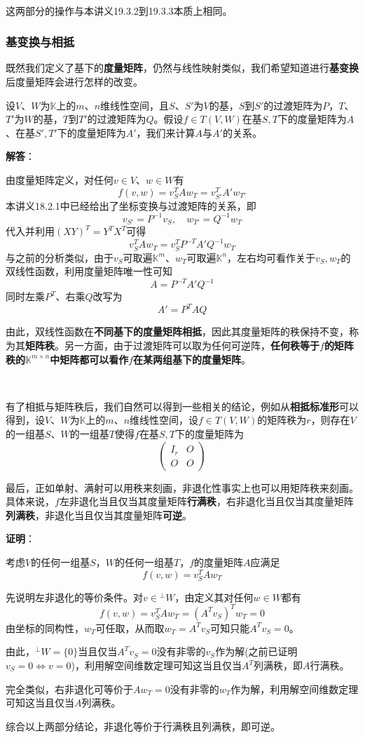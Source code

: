 \documentclass[a4paper,UTF8,fontset=windows,AutoFakeBold]{ctexart}
\newcommand*{\note}{\noindent *}
\newcommand{\proo}[1]{{\vspace{5pt}\kaishu\noindent\textbf{证明}：\vspace{-3pt}
\begin{compactitem}
    \item[] #1
\end{compactitem}
}}
\newcommand{\sol}[1]{{\vspace{5pt}\kaishu\noindent\textbf{解答}：\vspace{-3pt}
\begin{compactitem}
    \item[] #1
\end{compactitem}
}}
\begin{document}
\

\note 这两部分的操作与本讲义19.3.2到19.3.3本质上相同。

\subsubsection{基变换与相抵}
既然我们定义了基下的\textbf{度量矩阵}，仍然与线性映射类似，我们希望知道进行\textbf{基变换}后度量矩阵会进行怎样的改变。

设$V$、$W$为$\mathbb{K}$上的$m$、$n$维线性空间，且$S$、$S'$为$V$的基，$S$到$S'$的过渡矩阵为$P$，$T$、$T'$为$W$的基，$T$到$T'$的过渡矩阵为$Q$。假设$f\in T(V,W)$在基$S,T$下的度量矩阵为$A$、在基$S',T'$下的度量矩阵为$A'$，我们来计算$A$与$A'$的关系。

\sol{
    由度量矩阵定义，对任何$v\in V$、$w\in W$有
    $$f(v,w)=v_S^TAw_T=v_{S'}^TA'w_{T'}$$
    本讲义18.2.1中已经给出了坐标变换与过渡矩阵的关系，即
    $$v_{S'}=P^{-1}v_S,\quad w_{T'}=Q^{-1}w_T$$
    代入并利用$(XY)^T=Y^TX^T$可得
    $$v_S^TAw_T=v_S^TP^{-T}A'Q^{-1}w_T$$
    与之前的分析类似，由于$v_S$可取遍$\mathbb{K}^m$、$w_T$可取遍$\mathbb{K}^n$，左右均可看作关于$v_S,w_T$的双线性函数，利用度量矩阵唯一性可知
    $$A=P^{-T}A'Q^{-1}$$
    同时左乘$P^T$、右乘$Q$改写为
    $$A'=P^TAQ$$
}

由此，双线性函数在\textbf{不同基下的度量矩阵相抵}，因此其度量矩阵的秩保持不变，称为其\textbf{矩阵秩}。另一方面，由于过渡矩阵可以取为任何可逆阵，\textbf{任何秩等于$f$的矩阵秩的$\mathbb{K}^{m\times n}$中矩阵都可以看作$f$在某两组基下的度量矩阵}。

\

有了相抵与矩阵秩后，我们自然可以得到一些相关的结论，例如从\textbf{相抵标准形}可以得到，设$V$、$W$为$\mathbb{K}$上的$m$、$n$维线性空间，设$f\in T(V,W)$的矩阵秩为$r$，则存在$V$的一组基$S$、$W$的一组基$T$使得$f$在基$S,T$下的度量矩阵为
$$\begin{pmatrix}I_r&O\\O&O\end{pmatrix}$$

最后，正如单射、满射可以用秩来刻画，非退化性事实上也可以用矩阵秩来刻画。具体来说，$f$左非退化当且仅当其度量矩阵\textbf{行满秩}，右非退化当且仅当其度量矩阵\textbf{列满秩}，非退化当且仅当其度量矩阵\textbf{可逆}。

\proo{
    考虑$V$的任何一组基$S$，$W$的任何一组基$T$，$f$的度量矩阵$A$应满足
    $$f(v,w)=v_S^TAw_T$$

    先说明左非退化的等价条件。对$v\in{}^\bot W$，由定义其对任何$w\in W$都有
    $$f(v,w)=v_S^TAw_T=(A^Tv_S)^Tw_T=0$$
    由坐标的同构性，$w_T$可任取，从而取$w_T=A^Tv_S$可知只能$A^Tv_S=0$。

    由此，$^\bot W=\{0\}$当且仅当$A^Tv_S=0$没有非零的$v_S$作为解(之前已证明$v_S=0\Leftrightarrow v=0$)，利用解空间维数定理可知这当且仅当$A^T$列满秩，即$A$行满秩。

    完全类似，右非退化可等价于$Aw_T=0$没有非零的$w_T$作为解，利用解空间维数定理可知这当且仅当$A$列满秩。

    综合以上两部分结论，非退化等价于行满秩且列满秩，即可逆。
}
\end{document}
